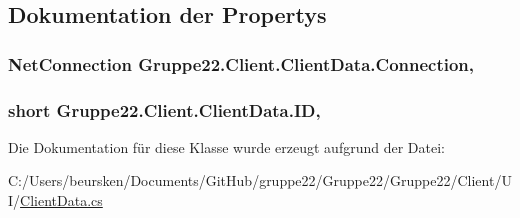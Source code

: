 \subsection{Dokumentation der Propertys}
\hypertarget{class_gruppe22_1_1_client_1_1_client_data_a73bd7a2152619a6f3a82c529153e680f}{
\subsubsection[{Connection}]{\setlength{\rightskip}{0pt plus 5cm}Net\-Connection Gruppe22.\-Client.\-Client\-Data.\-Connection\hspace{0.3cm}{\ttfamily [get]}, {\ttfamily [set]}}}\label{class_gruppe22_1_1_client_1_1_client_data_a73bd7a2152619a6f3a82c529153e680f}
\hypertarget{class_gruppe22_1_1_client_1_1_client_data_acafb077462c35a4455699df5dac0dc71}{
\subsubsection[{I\-D}]{\setlength{\rightskip}{0pt plus 5cm}short Gruppe22.\-Client.\-Client\-Data.\-I\-D\hspace{0.3cm}{\ttfamily [get]}, {\ttfamily [set]}}}\label{class_gruppe22_1_1_client_1_1_client_data_acafb077462c35a4455699df5dac0dc71}


Die Dokumentation für diese Klasse wurde erzeugt aufgrund der Datei\-:\begin{DoxyCompactItemize}
\item 
C\-:/\-Users/beursken/\-Documents/\-Git\-Hub/gruppe22/\-Gruppe22/\-Gruppe22/\-Client/\-U\-I/\hyperlink{_gruppe22_2_client_2_u_i_2_client_data_8cs}{Client\-Data.\-cs}\end{DoxyCompactItemize}
